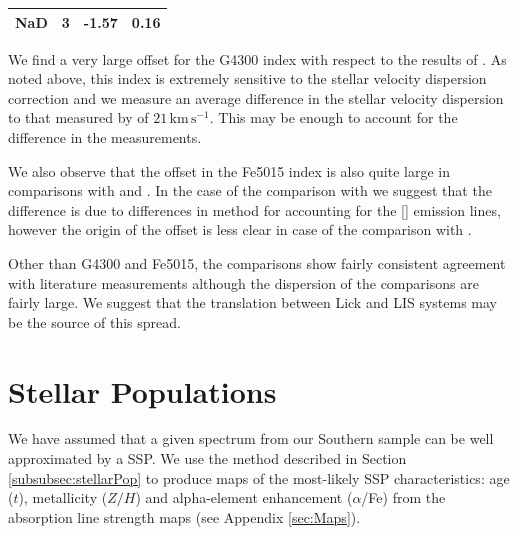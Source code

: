 \documentclass[a4paper,fleqn,usenatbib]{mnras}
\begin{document}
\begin{table}
\begin{tabular}{l r r r}
				NaD 		& 3 		& -1.57\leavevmode\phantom{0}& 0.16\leavevmode\phantom{0}	\\
				\hline
				\hline
			\end{tabular}
		\end{table}

		We find a very large offset for the G4300 index with respect to the results of \citet{Rampazzo2005}. As noted above, this index is extremely sensitive to the stellar velocity dispersion correction and we measure an average difference in the stellar velocity dispersion to that measured by \citet{Rampazzo2005} of $21\,\mathrm{km\,s^{-1}}$. This may be enough to account for the difference in the measurements.

		We also observe that the offset in the Fe5015 index is also quite large in comparisons with \citet{Rampazzo2005} and \citet{Vazdekis2010}. In the case of the comparison with \citet{Rampazzo2005} we suggest that the difference is due to differences in method for accounting for the [] emission lines, however the origin of the offset is less clear in case of the comparison with \citet{Vazdekis2010}. 

		Other than G4300 and Fe5015, the comparisons show fairly consistent agreement with literature measurements although the dispersion of the comparisons are fairly large. We suggest that the translation between Lick and LIS systems may be the source of this spread.

\section{Stellar Populations}
	\label{sec:stellarPop}
	We have assumed that a given spectrum from our Southern sample can be well approximated by a SSP. We use the method described in Section \ref{subsubsec:stellarPop} to produce maps of the most-likely SSP characteristics: age ($t$), metallicity ($Z/H$) and alpha-element enhancement ($\alpha$/Fe) from the absorption line strength maps (see Appendix \ref{sec:Maps}).
\end{document}
